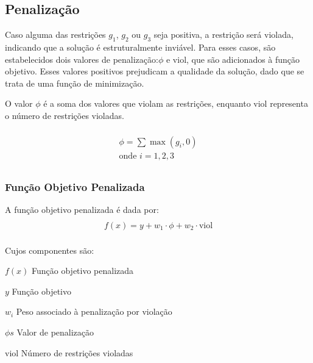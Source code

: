 \subsection{Penalização}

Caso alguma das restrições \(g_1\), \(g_2\) ou \(g_3\) seja positiva, a restrição será violada, indicando que a solução é estruturalmente inviável.
Para esses casos, são estabelecidos dois valores de penalização:\(\phi \) e \(\text{viol}\), que são adicionados à função objetivo.
Esses valores positivos prejudicam a qualidade da solução, dado que se trata de uma função de minimização.

O valor \(\phi \) é a soma dos valores que violam as restrições, enquanto \(\text{viol}\) representa o número de restrições violadas.

\begin{gather}
    \begin{align}
        \begin{split}
            \phi = \sum \max(g_i, 0) \\
            \text{onde~} i = 1, 2, 3
        \end{split}
    \end{align}
\end{gather}


\subsubsection{Função Objetivo Penalizada}

A função objetivo penalizada é dada por:
\begin{gather}
    \begin{align}
        \begin{split}
            f(x) = y + w_1 \cdot \phi + w_2 \cdot \text{viol}
        \end{split}
    \end{align}
\end{gather}

Cujos componentes são:

\begin{symbols}
    \item[\(f(x)\)] Função objetivo penalizada
    \item[\(y\)] Função objetivo
    \item[\(w_i\)] Peso associado à penalização por violação
    \item[\(\phi s\)] Valor de penalização
    \item[\(\text{viol}\)] Número de restrições violadas
\end{symbols}

